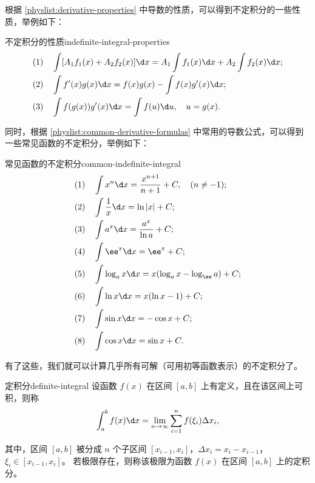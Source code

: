 根据 \cref{physlist:derivative-properties} 中导数的性质，可以得到不定积分的一些性质，举例如下：
\begin{physlist}{不定积分的性质}{indefinite-integral-properties}
    \begin{align}
         & (1)\quad \int [A_1 f_1(x) + A_2 f_2(x)] \d x = A_1 \int f_1(x) \d x + A_2 \int f_2(x) \d x ; \\
         & (2)\quad \int f'(x) g(x) \d x = f(x) g(x) - \int f(x) g'(x) \d x ;                           \\
         & (3)\quad \int f(g(x)) g'(x) \d x = \int f(u) \d u,\quad u = g(x) .
    \end{align}

\end{physlist}

同时，根据 \cref{physlist:common-derivative-formulas} 中常用的导数公式，可以得到一些常见函数的不定积分，举例如下：
\begin{physlist}{常见函数的不定积分}{common-indefinite-integral}
    \begin{align}
         & (1)\quad \int x^n \d x = \frac{x^{n+1}}{n+1} + C,\quad (n \neq -1) ; \\
         & (2)\quad \int \frac{1}{x} \d x = \ln |x| + C ;                       \\
         & (3)\quad \int a^x \d x = \frac{a^x}{\ln a} + C ;                     \\
         & (4)\quad \int \ee^x \d x = \ee^x + C ;                               \\
         & (5)\quad \int \log_a x \d x = x (\log_a x - \log_{\ee} a) + C ;      \\
         & (6)\quad \int \ln x \d x = x (\ln x - 1) + C ;                       \\
         & (7)\quad \int \sin x \d x = -\cos x + C ;                            \\
         & (8)\quad \int \cos x \d x = \sin x + C .
    \end{align}

\end{physlist}

有了这些，我们就可以计算几乎所有可解（可用初等函数表示）的不定积分了。

\bigskip

\begin{definition}{定积分}{definite-integral}
    设函数 $ f(x) $ 在区间 $ [a, b] $ 上有定义，且在该区间上可积，则称
    \begin{equation}
        \int_a^b f(x) \d x = \lim_{n \to \infty} \sum_{i=1}^n f(\xi_i) \Delta x_i,
    \end{equation}

    其中，区间 $ [a, b] $ 被分成 $ n $ 个子区间 $ [x_{i-1}, x_i] $，$ \Delta x_i = x_i - x_{i-1} $，$ \xi_i \in [x_{i-1}, x_i] $。
    若极限存在，则称该极限为函数 $ f(x) $ 在区间 $ [a, b] $ 上的定积分。

\end{definition}

